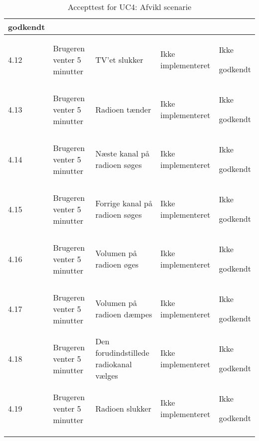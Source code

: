 \begin{longtable}{| l | >{\raggedright}X | >{\raggedright}X | >{\raggedright}X | >{\raggedright\arraybackslash}p{2.3cm} |}
	godkendt \\ \hline
	4.12 & Brugeren venter 5 minutter & TV'et slukker & Ikke implementeret & Ikke 
	
	godkendt \\ \hline
	4.13 & Brugeren venter 5 minutter & Radioen tænder & Ikke implementeret & Ikke 
	
	godkendt \\ \hline
	4.14 & Brugeren venter 5 minutter & Næste kanal på radioen søges & Ikke implementeret & Ikke 
	
	godkendt \\ \hline
	4.15 & Brugeren venter 5 minutter & Forrige kanal på radioen søges & Ikke implementeret & Ikke 
	
	godkendt \\ \hline
	4.16 & Brugeren venter 5 minutter & Volumen på radioen øges & Ikke implementeret & Ikke 
	
	godkendt \\ \hline
	4.17 & Brugeren venter 5 minutter & Volumen på radioen dæmpes & Ikke implementeret & Ikke 
	
	godkendt \\ \hline
	4.18 & Brugeren venter 5 minutter & Den forudindstillede radiokanal vælges & Ikke implementeret & Ikke 
	
	godkendt \\ \hline
	4.19 & Brugeren venter 5 minutter & Radioen slukker & Ikke implementeret & Ikke 
	
	godkendt \\ \hline
\caption{Accepttest for UC4: Afvikl scenarie}\label{tbl:acceptUC4}
\end{longtable}